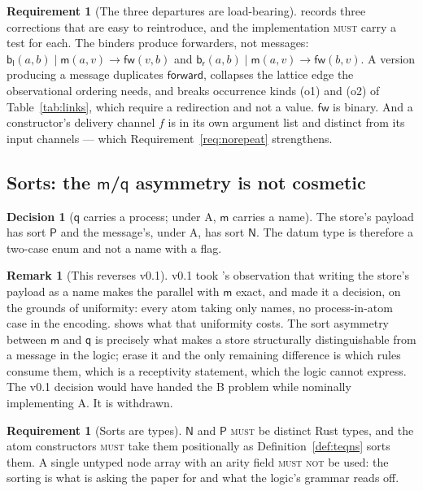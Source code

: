 \documentclass[11pt,a4paper]{article}
\newcommand{\MUST}{\textsc{must}}
\newcommand{\MUSTNOT}{\textsc{must not}}
\newcommand{\Nsort}{\mathsf{N}}
\newcommand{\Psort}{\mathsf{P}}
\newcommand{\mm}{\mathsf{m}}
\newcommand{\fw}{\mathsf{fw}}
\newcommand{\bl}{\mathsf{b}_{\mathsf{l}}}
\newcommand{\br}{\mathsf{b}_{\mathsf{r}}}
\newcommand{\qq}{\mathsf{q}}
\newcommand{\red}{\longrightarrow}
\theoremstyle{definition}
\newtheorem{requirement}[definition]{Requirement}
\newtheorem{decision}[definition]{Decision}
\newtheorem{remark}[definition]{Remark}
\theoremstyle{plain}
\begin{document}
\begin{requirement}[The three departures are load-bearing]\label{req:departures}
\cite[Rem.~3.4]{draft3} records three corrections that are easy to
reintroduce, and the implementation \MUST{} carry a test for each. The
binders produce forwarders, not messages: $\bl(a,b) \mid \mm(a,v) \red
\fw(v,b)$ and $\br(a,b) \mid \mm(a,v) \red \fw(b,v)$. A version producing a
message duplicates $\mathsf{forward}$, collapses the lattice edge the
observational ordering needs, and breaks occurrence kinds (o1) and (o2) of
Table~\ref{tab:links}, which require a redirection and not a value. $\fw$ is
binary. And a constructor's delivery channel $f$ is in its own argument list
and distinct from its input channels --- which
Requirement~\ref{req:norepeat} strengthens.
\end{requirement}

\subsection{Sorts: the $\mm$/$\qq$ asymmetry is not cosmetic}

\begin{decision}[$\qq$ carries a process; under A, $\mm$ carries a name]
\label{dec:qsort}
The store's payload has sort $\Psort$ and the message's, under A, has sort
$\Nsort$. The datum type is therefore a two-case enum and not a name with a
flag.
\end{decision}

\begin{remark}[This reverses v0.1]\label{rem:reverse}
v0.1 took \cite[Rem.~3.7]{draft3}'s observation that writing the store's
payload as a name makes the parallel with $\mm$ exact, and made it a
decision, on the grounds of uniformity: every atom taking only names, no
process-in-atom case in the encoding. \cite[Rem.~2.5]{logic} shows what that
uniformity costs. The sort asymmetry between $\mm$ and $\qq$ is precisely
what makes a store structurally distinguishable from a message in the logic;
erase it and the only remaining difference is which rules consume them, which
is a receptivity statement, which the logic cannot express. The v0.1 decision
would have handed \cite{logic} the B problem while nominally implementing A.
It is withdrawn.
\end{remark}

\begin{requirement}[Sorts are types]\label{req:sorts}
$\Nsort$ and $\Psort$ \MUST{} be distinct Rust types, and the atom
constructors \MUST{} take them positionally as
Definition~\ref{def:teqns} sorts them. A single untyped node array with an
arity field \MUSTNOT{} be used: the sorting is what
\cite[Rem.~2.6]{logic} is asking the paper for and what the logic's grammar
reads off.
\end{requirement}
\end{document}
